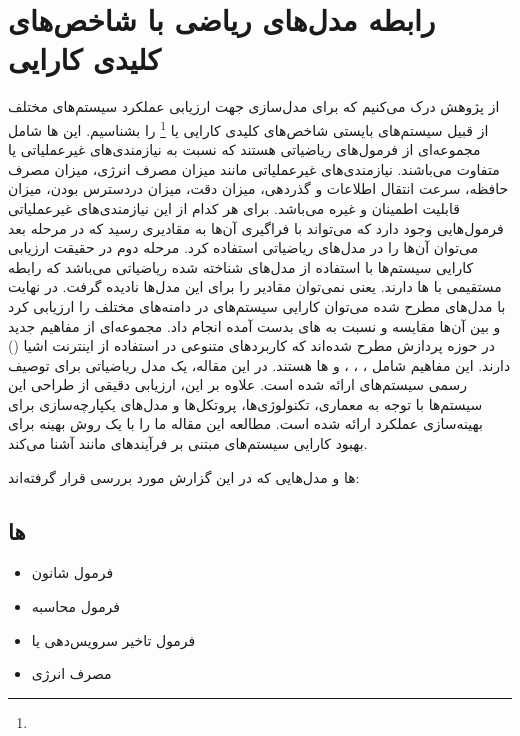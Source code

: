 \section{رابطه مدل‌های ریاضی با شاخص‌های کلیدی کارایی}

از پژوهش \cite{vcolakovic2023iot} درک می‌کنیم که برای مدل‌سازی جهت ارزیابی
عملکرد سیستم‌های مختلف از قبیل سیستم‌های  بایستی شاخص‌های کلیدی کارایی
یا  \footnote{} را بشناسیم. این
ها شامل مجموعه‌ای از فرمول‌های ریاضیاتی هستند که نسبت به نیازمندی‌های
غیرعملیاتی یا  متفاوت می‌باشند. نیازمندی‌های
غیرعملیاتی مانند میزان مصرف انرژی، میزان مصرف حافظه، سرعت انتقال اطلاعات و
گذردهی، میزان دقت، میزان دردسترس بودن، میزان قابلیت اطمینان و غیره می‌باشد. برای
هر کدام از این نیازمندی‌های غیرعملیاتی فرمول‌هایی وجود دارد که می‌تواند با
فراگیری آن‌ها به مقادیری رسید که در مرحله بعد می‌توان آن‌ها را در مدل‌های
ریاضیاتی استفاده کرد.  مرحله دوم در حقیقت ارزیابی کارایی سیستم‌ها با استفاده از
مدل‌های شناخته شده ریاضیاتی می‌باشد که رابطه مستقیمی با ‌ها دارند. یعنی
‌نمی‌توان مقادیر  را برای این مدل‌ها نادیده گرفت. در نهایت با مدل‌های
مطرح شده می‌توان کارایی سیستم‌های  در دامنه‌های مختلف را ارزیابی کرد و
بین آن‌ها مقایسه و  نسبت به های بدست آمده انجام داد.
مجموعه‌ای از مفاهیم جدید در حوزه پردازش مطرح شده‌اند که کاربردهای متنوعی در
استفاده از اینترنت اشیا () دارند. این مفاهیم شامل ،
، ،  و
 ‌ها هستند. در این مقاله، یک مدل ریاضیاتی برای توصیف رسمی سیستم‌های
 ارائه شده است. علاوه بر این، ارزیابی دقیقی از طراحی این سیستم‌ها با
توجه به معماری، تکنولوژی‌ها، پروتکل‌ها و مدل‌های یکپارچه‌سازی برای بهینه‌سازی
عملکرد ارائه شده است. مطالعه این مقاله ما را با یک روش بهینه برای بهبود کارایی
سیستم‌های مبتنی بر فرآیندهای  مانند  آشنا
می‌کند.

ها و مدل‌هایی که در این گزارش مورد بررسی قرار گرفته‌اند:

\subsection{ها}

\begin{itemize}
    \item فرمول شانون
    \item فرمول محاسبه 
    \item فرمول تاخیر سرویس‌دهی یا 
    \item مصرف انرژی
\end{itemize}

